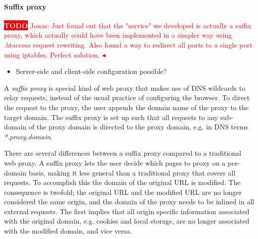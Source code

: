 \documentclass{llncs}
\newcommand{\todo}[1]{\colorbox{red}{\textcolor{white}{\sffamily\bfseries\scriptsize TODO}} \textcolor{red}{#1} \textcolor{red}{$\blacktriangleleft$}}
\begin{document}
\paragraph{Suffix proxy}
\todo{Jonas: Just found out that the "service" we developed is actually a suffix proxy, which actually could have been implemented in a simpler way using .htaccess request rewriting. Also found a way to redirect all ports to a single port using iptables. Perfect solution.}
\begin{itemize}
\item Server-side and client-side configuration possible?
\end{itemize}


A \emph{suffix proxy} is special kind of web proxy that makes use of DNS wildcards to 
relay requests, instead of the usual practice of configuring the browser.
To direct the request to the proxy, the user appends the domain name of the 
proxy to the target domain. The suffix proxy is set up such
that all requests to any sub-domain of the proxy domain is directed to the proxy domain, 
e.g. in DNS terms \emph{*.proxy.domain}. 

There are several differences between a suffix proxy compared to a traditional 
web proxy. A suffix proxy lets the user decide which pages to proxy on a 
per-domain basis, making it less general than a traditional proxy that covers 
all requests. To accomplish this the domain of the original URL is modified.
The consequence is twofold; the original URL and the modified URL are no longer 
considered the same origin, and the domain of the proxy needs to 
be inlined in all external requests. The first implies that all origin specific 
information associated with the original domain, e.g. cookies and local storage, 
are no longer associated with the modified domain, and vice versa. 
\end{document}
